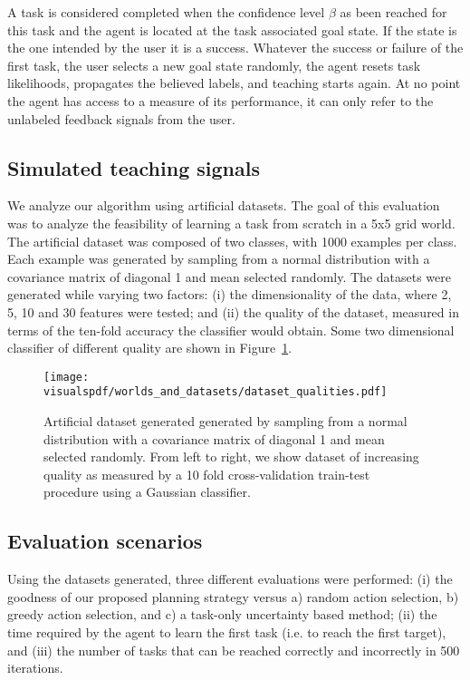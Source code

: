 A task is considered completed when the confidence level $\beta$ as been reached for this task and the agent is located at the task associated goal state. If the state is the one intended by the user it is a success. Whatever the success or failure of the first task, the user selects a new goal state randomly, the agent resets task likelihoods, propagates the believed labels, and teaching starts again. At no point the agent has access to a measure of its performance, it can only refer to the unlabeled feedback signals from the user.

\subsection{Simulated teaching signals}

We analyze our algorithm using artificial datasets. The goal of this evaluation was to analyze the feasibility of learning a task from scratch in a 5x5 grid world. The artificial dataset was composed of two classes, with 1000 examples per class. Each example was generated by sampling from a normal distribution with a covariance matrix of diagonal 1 and mean selected randomly. The datasets were generated while varying two factors: (i) the dimensionality of the data, where 2, 5, 10 and 30 features were tested; and (ii) the quality of the dataset, measured in terms of the ten-fold accuracy the classifier would obtain. Some two dimensional classifier of different quality are shown in Figure~\ref{fig:datasetsquality}.

\begin{figure}[!ht]
  \centering
      \texttt{[image: \\visualspdf/worlds\_and\_datasets/dataset\_qualities.pdf]}
      \caption{Artificial dataset generated generated by sampling from a normal distribution with a covariance matrix of diagonal 1 and mean selected randomly. From left to right, we show dataset of increasing quality as measured by a 10 fold cross-validation train-test procedure using a Gaussian classifier.}
    \label{fig:datasetsquality}
\end{figure}


\subsection{Evaluation scenarios}

Using the datasets generated, three different evaluations were performed: (i) the goodness of our proposed planning strategy versus a) random action selection, b) greedy action selection, and c) a task-only uncertainty based method; (ii) the time required by the agent to learn the first task (i.e. to reach the first target), and (iii) the number of tasks that can be reached correctly and incorrectly in 500 iterations.

